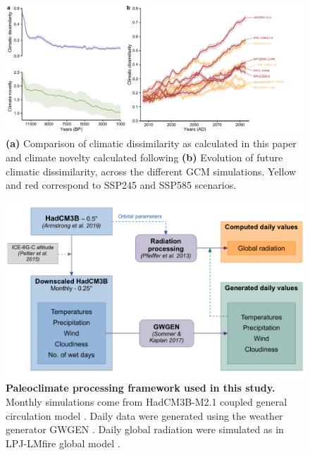 \documentclass[pdflatex, sn-nature, oneside]{sn-jnl}%
\begin{document}
\begin{figure}
\hspace*{-0.5in}
\centering
\includegraphics{climatic_dissimilarity_and_distance-1.pdf}
\caption{\textbf{(a)} Comparison of climatic dissimilarity as calculated in this paper and climate novelty calculated following \cite{Burke2019} \textbf{(b)} Evolution of future climatic dissimilarity, across the different GCM simulations. Yellow and red correspond to SSP245 and SSP585 scenarios. }
\end{figure}

\begin{figure}
\hspace*{-0.7in}
\centering
\includegraphics[scale=0.85]{paleoclimate_processing.pdf}
\caption{\textbf{Paleoclimate processing framework used in this study.} Monthly simulations come from HadCM3B-M2.1 coupled general circulation model \cite{Armstrong2019}. Daily data were generated using the weather generator GWGEN \cite{Sommer2017}. Daily global radiation were simulated as in LPJ-LMfire global model \cite{Pfeiffer2013}.}
\end{figure}
\end{document}
